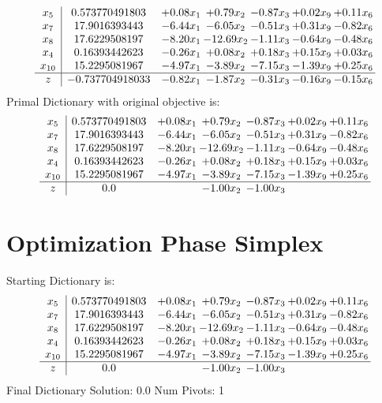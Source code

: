 \documentclass[9pt]{article}
\begin{document}
\[\begin{array}{c| c c@{\hskip 2pt} c@{\hskip 2pt} c@{\hskip 2pt} c@{\hskip 2pt} c@{\hskip 2pt} }
 x_{5}   &  0.573770491803 & +  0.08 x_{1} & +  0.79 x_{2} & -0.87 x_{3} & +  0.02 x_{9} & +  0.11 x_{6}\\
 x_{7}   &  17.9016393443 & -6.44 x_{1} & -6.05 x_{2} & -0.51 x_{3} & +  0.31 x_{9} & -0.82 x_{6}\\
 x_{8}   &  17.6229508197 & -8.20 x_{1} & -12.69 x_{2} & -1.11 x_{3} & -0.64 x_{9} & -0.48 x_{6}\\
 x_{4}   &  0.16393442623 & -0.26 x_{1} & +  0.08 x_{2} & +  0.18 x_{3} & +  0.15 x_{9} & +  0.03 x_{6}\\
 x_{10}   &  15.2295081967 & -4.97 x_{1} & -3.89 x_{2} & -7.15 x_{3} & -1.39 x_{9} & +  0.25 x_{6}\\
\hline
z    &  -0.737704918033 & -0.82 x_{1} & -1.87 x_{2} & -0.31 x_{3} & -0.16 x_{9} & -0.15 x_{6}\\
\end{array}\]
Primal Dictionary with original objective is:
\[\begin{array}{c| c c@{\hskip 2pt} c@{\hskip 2pt} c@{\hskip 2pt} c@{\hskip 2pt} c@{\hskip 2pt} }
 x_{5}   &  0.573770491803 & +  0.08 x_{1} & +  0.79 x_{2} & -0.87 x_{3} & +  0.02 x_{9} & +  0.11 x_{6}\\
 x_{7}   &  17.9016393443 & -6.44 x_{1} & -6.05 x_{2} & -0.51 x_{3} & +  0.31 x_{9} & -0.82 x_{6}\\
 x_{8}   &  17.6229508197 & -8.20 x_{1} & -12.69 x_{2} & -1.11 x_{3} & -0.64 x_{9} & -0.48 x_{6}\\
 x_{4}   &  0.16393442623 & -0.26 x_{1} & +  0.08 x_{2} & +  0.18 x_{3} & +  0.15 x_{9} & +  0.03 x_{6}\\
 x_{10}   &  15.2295081967 & -4.97 x_{1} & -3.89 x_{2} & -7.15 x_{3} & -1.39 x_{9} & +  0.25 x_{6}\\
\hline
z    &  0.0  &   & -1.00 x_{2} & -1.00 x_{3} &    &   \\
\end{array}\]
\section{Optimization Phase Simplex}
Starting Dictionary is:
\[\begin{array}{c| c c@{\hskip 2pt} c@{\hskip 2pt} c@{\hskip 2pt} c@{\hskip 2pt} c@{\hskip 2pt} }
 x_{5}   &  0.573770491803 & +  0.08 x_{1} & +  0.79 x_{2} & -0.87 x_{3} & +  0.02 x_{9} & +  0.11 x_{6}\\
 x_{7}   &  17.9016393443 & -6.44 x_{1} & -6.05 x_{2} & -0.51 x_{3} & +  0.31 x_{9} & -0.82 x_{6}\\
 x_{8}   &  17.6229508197 & -8.20 x_{1} & -12.69 x_{2} & -1.11 x_{3} & -0.64 x_{9} & -0.48 x_{6}\\
 x_{4}   &  0.16393442623 & -0.26 x_{1} & +  0.08 x_{2} & +  0.18 x_{3} & +  0.15 x_{9} & +  0.03 x_{6}\\
 x_{10}   &  15.2295081967 & -4.97 x_{1} & -3.89 x_{2} & -7.15 x_{3} & -1.39 x_{9} & +  0.25 x_{6}\\
\hline
z    &  0.0  &   & -1.00 x_{2} & -1.00 x_{3} &    &   \\
\end{array}\]
Final Dictionary
Solution:  0.0
Num Pivots:  1
\end{document}
